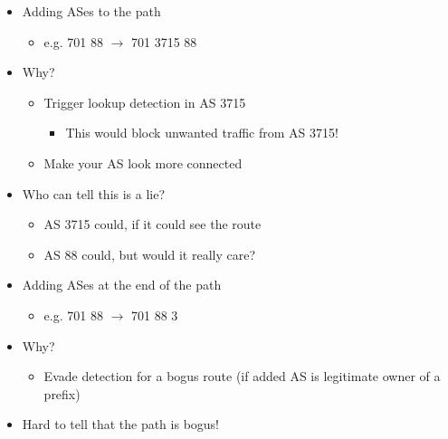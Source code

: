 \begin{itemize}[nosep]
    \item Adding ASes to the path
          \begin{itemize}[nosep]
              \item e.g. 701 88 $\to$ 701 3715 88
          \end{itemize}
    \item Why?
          \begin{itemize}[nosep]
              \item Trigger lookup detection in AS 3715
                    \begin{itemize}[nosep]
                        \item This would block unwanted traffic from AS 3715!
                    \end{itemize}
              \item Make your AS look more connected
          \end{itemize}
    \item Who can tell this is a lie?
          \begin{itemize}[nosep]
              \item AS 3715 could, if it could see the route
              \item AS 88 could, but would it really care?
          \end{itemize}
\end{itemize}


\begin{itemize}[nosep]
    \item Adding ASes at the end of the path
          \begin{itemize}[nosep]
              \item e.g. 701 88 $\to$ 701 88 3
          \end{itemize}
    \item Why?
          \begin{itemize}[nosep]
              \item Evade detection for a bogus route (if added AS is legitimate owner of a prefix)
          \end{itemize}
    \item Hard to tell that the path is bogus!
\end{itemize}